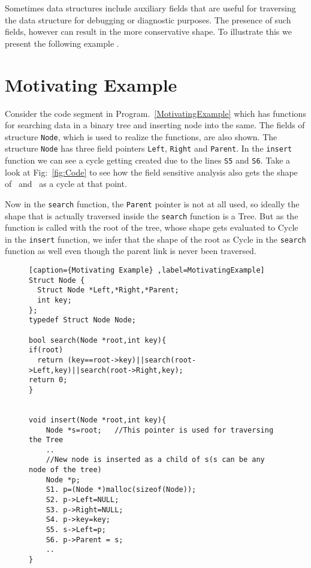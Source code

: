 Sometimes data structures include auxiliary fields that are useful for traversing the data structure
for debugging or diagnostic purposes. The presence of such fields, however can result in the more conservative shape.
To illustrate this we present the following example .

\section{Motivating Example}

\begin{example}
Consider the code segment in Program.~\ref{MotivatingExample} which has functions for searching data in a binary tree and 
inserting node into the same. The fields of structure {\tt Node}, which is used to realize the functions, are also shown. The 
structure {\tt Node} has three field pointers {\tt Left}, {\tt Right} and {\tt Parent}.
In the {\tt insert} function we can see a cycle getting created due to the lines {\tt S5} and {\tt S6}.
Take a look at Fig:~\ref{fig:Code} to see how the field sensitive analysis also
gets the shape of  \p  \ and  \s \ as a cycle at that point.

Now in the {\tt search} function, the {\tt Parent} pointer is
not at all used, so ideally the shape that is actually traversed inside the {\tt search} function is a Tree. But as the function is called
with the root of the tree, whose shape gets evaluated to Cycle in the {\tt insert} function,
we infer that the shape of the root as Cycle in the {\tt search} function as well even though the parent link is never been traversed. 
\end{example}
        
% 
\begin{figure}
\begin{lstlisting}[caption={Motivating Example} ,label=MotivatingExample]
Struct Node {
  Struct Node *Left,*Right,*Parent;
  int key;
};
typedef Struct Node Node;

bool search(Node *root,int key){
if(root)
  return (key==root->key)||search(root->Left,key)||search(root->Right,key);
return 0;
}


void insert(Node *root,int key){
    Node *s=root;   //This pointer is used for traversing the Tree 
    ..
    //New node is inserted as a child of s(s can be any node of the tree)
    Node *p;
    S1. p=(Node *)malloc(sizeof(Node));    	
    S2. p->Left=NULL;			
    S3. p->Right=NULL;			
    S4. p->key=key;				
    S5. s->Left=p;				
    S6. p->Parent = s;			
    ..
}

\end{lstlisting}
\end{figure}

